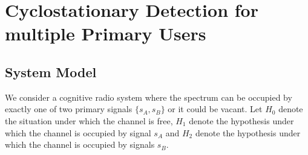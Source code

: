 \section{Cyclostationary Detection for multiple Primary Users}
\subsection{System Model}

We consider a cognitive radio system where the spectrum can be occupied by exactly one of two primary signals $\{s_A, s_B\}$ or it could be vacant. Let $H_0$ denote the situation under which the channel is free, $H_1$ denote the hypothesis under which the channel is occupied by signal $s_A$ and $H_2$ denote the hypothesis under which the channel is occupied by signals $s_B$.  

